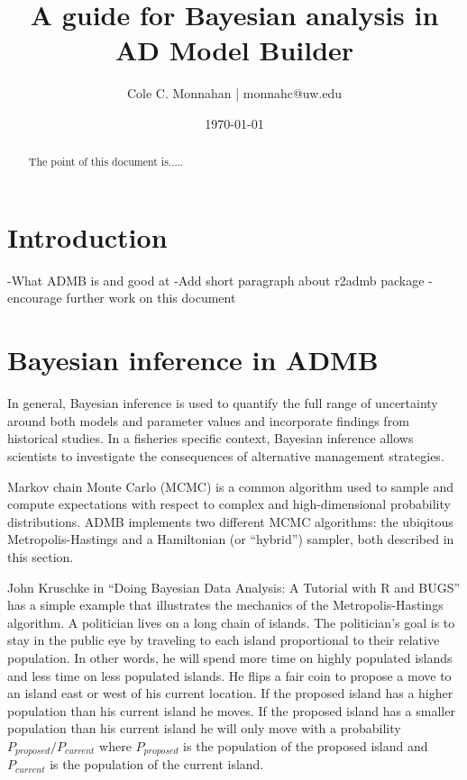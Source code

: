 \documentclass{article}\usepackage[]{graphicx}\usepackage[]{color}
\begin{document}
\title{A guide for Bayesian analysis in AD Model Builder}
\author{Cole C. Monnahan | monnahc@uw.edu}
\date{\today{}}
\maketitle
\begin{abstract}
  The point of this document is.....
\end{abstract}

\tableofcontents

\section{Introduction}
-What ADMB is and good at
-Add short paragraph about r2admb package
-encourage further work on this document
\section{Bayesian inference in ADMB}
In general, Bayesian inference is used to quantify the full
range of uncertainty around both models and parameter values
and incorporate findings from historical studies. In a
fisheries specific context, Bayesian inference allows
scientists to investigate the consequences of alternative
management strategies.

Markov chain Monte Carlo (MCMC) is a common algorithm used
to sample and compute expectations with respect to complex
and high-dimensional probability distributions.  ADMB
implements two different MCMC algorithms: the ubiqitous
Metropolis-Hastings and a Hamiltonian (or ``hybrid'')
sampler, both described in this section.

John Kruschke in ``Doing Bayesian Data Analysis: A Tutorial
with R and BUGS'' has a simple example that illustrates the
mechanics of the Metropolis-Hastings algorithm. A politician
lives on a long chain of islands. The politician's goal is
to stay in the public eye by traveling to each island
proportional to their relative population. In other words,
he will spend more time on highly populated islands and less
time on less populated islands. He flips a fair coin to
propose a move to an island east or west of his current
location. If the proposed island has a higher population
than his current island he moves. If the proposed island has
a smaller population than his current island he will only
move with a probability $P_{proposed} / P_{current}$ where
$P_{proposed}$ is the population of the proposed island and
$P_{current}$ is the population of the current island.
\end{document}
